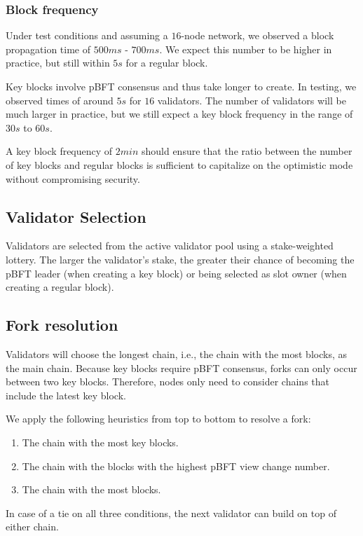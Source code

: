 \documentclass[8pt,fleqn,openany]{book}
\begin{document}
	\subsubsection{Block frequency}
	Under test conditions and assuming a $16$-node network, we observed a block propagation time of $500ms$ - $700ms$. We expect this number to be higher in practice, but still within $5s$ for a regular block. 
	
	Key blocks involve pBFT consensus and thus take longer to create. In testing, we observed times of around $5s$ for $16$ validators. The number of validators will be much larger in practice, but we still expect a key block frequency in the range of $30s$ to $60s$.
	
	A key block frequency of $2min$ should ensure that the ratio between the number of key blocks and regular blocks is sufficient to capitalize on the optimistic mode without compromising security.
	
	\subsection{Validator Selection}
	Validators are selected from the active validator pool using a stake-weighted lottery. The larger the validator’s stake, the greater their chance of becoming the pBFT leader (when creating a key block) or being selected as slot owner (when creating a regular block).
	
	\subsection{Fork resolution}
	Validators will choose the longest chain, i.e., the chain with the most blocks, as the main chain. Because key blocks require pBFT consensus, forks can only occur between two key blocks. Therefore, nodes only need to consider chains that include the latest key block.
	
	We apply the following heuristics from top to bottom to resolve a fork:
	
	\begin{enumerate}
		\item The chain with the most key blocks.
		\item The chain with the blocks with the highest pBFT view change number.
		\item The chain with the most blocks.
	\end{enumerate}
	
	In case of a tie on all three conditions, the next validator can build on top of either chain.
	
\end{document}
